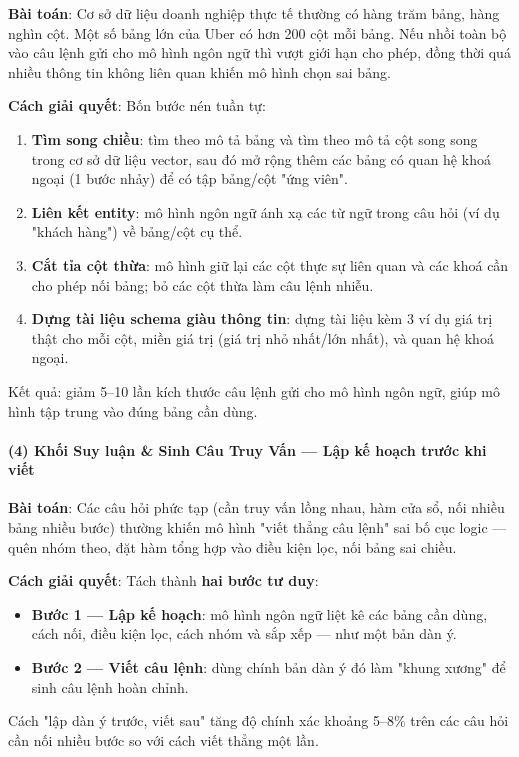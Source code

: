 \documentclass[11pt,a4paper]{article}
\begin{document}
\begin{tcolorbox}[notebox]
\textbf{Bài toán}: Cơ sở dữ liệu doanh nghiệp thực tế thường có hàng trăm bảng, hàng nghìn cột. Một số bảng lớn của Uber có hơn 200 cột mỗi bảng. Nếu nhồi toàn bộ vào câu lệnh gửi cho mô hình ngôn ngữ thì vượt giới hạn cho phép, đồng thời quá nhiều thông tin không liên quan khiến mô hình chọn sai bảng.

\textbf{Cách giải quyết}: Bốn bước nén tuần tự:
\begin{enumerate}
\item \textbf{Tìm song chiều}: tìm theo mô tả bảng và tìm theo mô tả cột song song trong cơ sở dữ liệu vector, sau đó mở rộng thêm các bảng có quan hệ khoá ngoại (1 bước nhảy) để có tập bảng/cột "ứng viên".
\item \textbf{Liên kết entity}: mô hình ngôn ngữ ánh xạ các từ ngữ trong câu hỏi (ví dụ "khách hàng") về bảng/cột cụ thể.
\item \textbf{Cắt tỉa cột thừa}: mô hình giữ lại các cột thực sự liên quan và các khoá cần cho phép nối bảng; bỏ các cột thừa làm câu lệnh nhiễu.
\item \textbf{Dựng tài liệu schema giàu thông tin}: dựng tài liệu kèm 3 ví dụ giá trị thật cho mỗi cột, miền giá trị (giá trị nhỏ nhất/lớn nhất), và quan hệ khoá ngoại.
\end{enumerate}

Kết quả: giảm 5--10 lần kích thước câu lệnh gửi cho mô hình ngôn ngữ, giúp mô hình tập trung vào đúng bảng cần dùng.
\end{tcolorbox}

\paragraph{(4) Khối Suy luận \& Sinh Câu Truy Vấn --- Lập kế hoạch trước khi viết}

\begin{tcolorbox}[notebox]
\textbf{Bài toán}: Các câu hỏi phức tạp (cần truy vấn lồng nhau, hàm cửa sổ, nối nhiều bảng nhiều bước) thường khiến mô hình "viết thẳng câu lệnh" sai bố cục logic --- quên nhóm theo, đặt hàm tổng hợp vào điều kiện lọc, nối bảng sai chiều.

\textbf{Cách giải quyết}: Tách thành \textbf{hai bước tư duy}:
\begin{itemize}
\item \textbf{Bước 1 --- Lập kế hoạch}: mô hình ngôn ngữ liệt kê các bảng cần dùng, cách nối, điều kiện lọc, cách nhóm và sắp xếp --- như một bản dàn ý.
\item \textbf{Bước 2 --- Viết câu lệnh}: dùng chính bản dàn ý đó làm "khung xương" để sinh câu lệnh hoàn chỉnh.
\end{itemize}

Cách "lập dàn ý trước, viết sau" tăng độ chính xác khoảng 5--8\% trên các câu hỏi cần nối nhiều bước so với cách viết thẳng một lần.
\end{tcolorbox}
\end{document}

